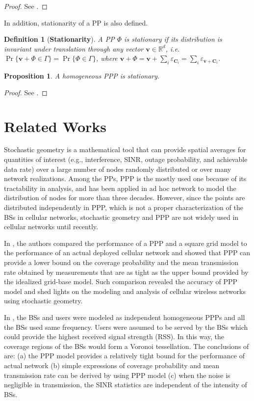\documentclass[a4paper,twocolumn]{IEEEtran}
\newtheorem{definition}{\textbf{Definition}}
\newtheorem{proposition}{\textbf{Proposition}}
\begin{document}
\begin{proof}
See \cite[Theorem 1.4.5]{Baccelli2009Vol1}.
\end{proof}
In addition, stationarity of a PP is also defined.
\begin{definition}[\textbf{Stationarity}]
A PP $\Phi$ is stationary if its distribution is invariant under translation through any vector $\bm{v}\in\mathbb{R}^d$, i.e. $\Pr\{\bm{v}+\Phi \in \Gamma\}=\Pr\{\Phi \in \Gamma\}$, where $\bm{v}+\Phi=\bm{v}+\sum_i \varepsilon_{\bm{C}_i} = \sum_i \varepsilon_{\bm{v}+\bm{C}_i}$.
\end{definition}
\begin{proposition}
A homogeneous PPP is stationary.
\end{proposition}
\begin{proof}
See \cite[Proposition 1.6.2]{Baccelli2009Vol1}.
\end{proof}

\section{Related Works}\label{Sec:Rel}
Stochastic geometry is a mathematical tool that can provide spatial averages for quantities of interest (e.g., interference, SINR, outage probability, and achievable data rate) over a large number of nodes randomly distributed or over many network realizations\cite{Haenggi2009JSAC}. Among the PPs, PPP is the mostly used one because of its tractability in analysis, and has been applied in ad hoc network to model the distribution of nodes for more than three decades\cite{Kleinrock1978}. However, since the points are distributed independently in PPP, which is not a proper characterization of the BSs in cellular networks, stochastic geometry and PPP are not widely used in cellular networks until recently.     

In \cite{Andrews2011TC}, the authors compared the performance of a PPP and a square grid model to the performance of an actual deployed cellular network and showed that PPP can provide a lower bound on the coverage probability and the mean transmission rate obtained by measurements that are as tight as the upper bound provided by the idealized grid-base model. Such comparison revealed the accuracy of PPP model and shed lights on the modeling and analysis of cellular wireless networks using stochastic geometry.

In \cite{Andrews2011TC}, the BSs and users were modeled as independent homogeneous PPPs and all the BSs used same frequency. Users were assumed to be served by the BSs which could provide the highest received signal strength (RSS). In this way, the coverage regions of the BSs would form a Voronoi tessellation\cite{Okabe1992}. The conclusions of \cite{Andrews2011TC} are: (a) the PPP model provides a relatively tight bound for the performance of actual network (b) simple expressions of coverage probability and mean transmission rate can be derived by using PPP model (c) when the noise is negligible in transmission, the SINR statistics are independent of the intensity of BSs.
\end{document}
